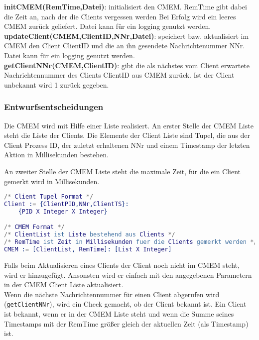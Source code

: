 \documentclass{article}
\begin{document}
\textbf{initCMEM(RemTime,Datei)}: initialisiert den CMEM. RemTime gibt dabei die Zeit an, nach der die Clients vergessen werden Bei Erfolg wird ein leeres CMEM zurück geliefert. Datei kann für ein logging genutzt werden.\\

\textbf{updateClient(CMEM,ClientID,NNr,Datei)}: speichert bzw. aktualisiert im CMEM den Client ClientID und die an ihn gesendete Nachrichtenummer NNr. Datei kann für ein logging genutzt werden.\\

\textbf{getClientNNr(CMEM,ClientID)}: gibt die als nächstes vom Client erwartete Nachrichtennummer des Clients ClientID aus CMEM zurück. Ist der Client unbekannt wird 1 zurück gegeben.\\

\subsubsection{Entwurfsentscheidungen}
Die CMEM wird mit Hilfe einer Liste realisiert. An erster Stelle der CMEM Liste steht die Liste der Clients. Die Elemente der Client Liste sind Tupel, die aus der Client Prozess ID, der zuletzt erhaltenen NNr und einem Timestamp der letzten Aktion in Millisekunden bestehen.

An zweiter Stelle der CMEM Liste steht die maximale Zeit, für die ein Client gemerkt wird in Millisekunden.

\begin{lstlisting}[language=erlang]
/* Client Tupel Format */
Client := {ClientPID,NNr,ClientTS}:
    {PID X Integer X Integer}

/* CMEM Format */
/* ClientList ist Liste bestehend aus Clients */
/* RemTime ist Zeit in Millisekunden fuer die Clients gemerkt werden */
CMEM := [ClientList, RemTime]: [List X Integer]
\end{lstlisting}

Falls beim Aktualisieren eines Clients der Client noch nicht im CMEM steht, wird er hinzugefügt.
Ansonsten wird er einfach mit den angegebenen Parametern in der CMEM Client Liste aktualisiert.\\

Wenn die nächste Nachrichtennummer für einen Client abgerufen wird (\texttt{getClientNNr}), wird ein Check gemacht, ob der Client bekannt ist.
Ein Client ist bekannt, wenn er in der CMEM Liste steht und wenn die Summe seines Timestamps mit der RemTime größer gleich der aktuellen Zeit (als Timestamp) ist.\\
\end{document}
